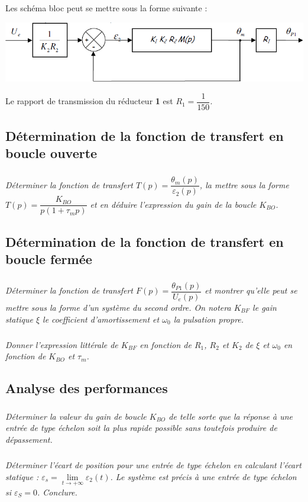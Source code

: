 \documentclass[11pt,oneside]{article}
\begin{document}
 Les schéma bloc peut se mettre sous la forme suivante :
\begin{center}
\includegraphics[width=.7\textwidth]{png/image4}
\end{center}

Le rapport de transmission du réducteur \textbf{1} est $R_1=\dfrac{1}{150}$.

\subsection{Détermination de la fonction de transfert en boucle ouverte}
\subparagraph{}
\textit{Déterminer la fonction de transfert $T(p)=\dfrac{\theta_{m}(p)}{\varepsilon_2(p)}$, la mettre sous la forme 
$T(p)=\dfrac{K_{BO}}{p\left( 1+\tau_m p\right)}$ et en déduire l'expression du gain de la boucle $K_{BO}$.}

\subsection{Détermination de la fonction de transfert en boucle fermée}
\subparagraph{}
\textit{Déterminer la fonction de transfert $F(p)=\dfrac{\theta_{P1}(p)}{U_e(p)}$ et montrer qu'elle peut se mettre sous la forme d'un système du second ordre. On notera $K_{BF}$ le gain statique $\xi$ le coefficient d'amortissement et $\omega_0$ la pulsation propre.}

\subparagraph{}
\textit{Donner l'expression littérale de $K_{BF}$ en fonction de $R_1$, $R_2$ et $K_2$ de $\xi$ et $\omega_0$ en fonction de $K_{BO}$ et $\tau_m$.}


\subsection{Analyse des performances}
\subparagraph{\label{ques}}
\textit{Déterminer la valeur du gain de boucle $K_{BO}$ de telle sorte que la réponse à une entrée de type échelon soit la plus rapide possible sans toutefois produire de dépassement.}

\subparagraph{}
\textit{Déterminer l'écart de position pour une entrée de type échelon en calculant l'écart statique : 
$\varepsilon_s = \lim\limits_{t\to +\infty}\varepsilon_2(t)$. Le système est précis à une entrée de type échelon si $\varepsilon_S=0$. Conclure.}
\end{document}
